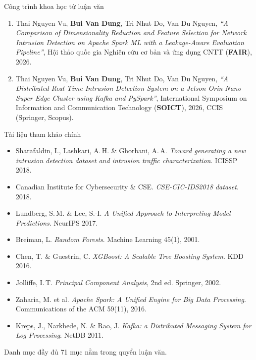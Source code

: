 \documentclass[aspectratio=169, 11pt]{beamer}
\begin{document}
\begin{frame}{Công trình khoa học từ luận văn}
  \begin{enumerate}
    \item Thai Nguyen Vu, \textbf{Bui Van Dung}, Tri Nhut Do, Van Du Nguyen,
      \emph{``A Comparison of Dimensionality Reduction and Feature Selection for
      Network Intrusion Detection on Apache Spark ML with a Leakage-Aware
      Evaluation Pipeline''}, Hội thảo quốc gia Nghiên cứu cơ bản và ứng dụng
      CNTT (\textbf{FAIR}), 2026. 
    \item Thai Nguyen Vu, \textbf{Bui Van Dung}, Tri Nhut Do, Van Du Nguyen,
      \emph{``A Distributed Real-Time Intrusion Detection System on a Jetson
      Orin Nano Super Edge Cluster using Kafka and PySpark''}, International
      Symposium on Information and Communication Technology (\textbf{SOICT}),
      2026, CCIS (Springer, Scopus). 
  \end{enumerate}
\end{frame}

\begin{frame}[label=bk-refs]{Tài liệu tham khảo chính}
  \begin{itemize}\footnotesize
    \setlength{\itemsep}{0.35em}
    \item[{[1]}] Sharafaldin, I., Lashkari, A.\,H. \& Ghorbani, A.\,A.
          \emph{Toward generating a new intrusion detection dataset and
          intrusion traffic characterization}. ICISSP 2018.
          \hfill{}
    \item[{[2]}] Canadian Institute for Cybersecurity \& CSE.
          \emph{CSE-CIC-IDS2018 dataset}. 2018.
          \hfill{}
    \item[{[3]}] Lundberg, S.\,M. \& Lee, S.-I. \emph{A Unified Approach to
          Interpreting Model Predictions}. NeurIPS 2017.
          \hfill{}
    \item[{[4]}] Breiman, L. \emph{Random Forests}. Machine Learning 45(1), 2001.
          \hfill{}
    \item[{[5]}] Chen, T. \& Guestrin, C. \emph{XGBoost: A Scalable Tree Boosting
          System}. KDD 2016.
          \hfill{}
    \item[{[6]}] Jolliffe, I.\,T. \emph{Principal Component Analysis}, 2nd ed.
          Springer, 2002.
          \hfill{}
    \item[{[7]}] Zaharia, M. et al. \emph{Apache Spark: A Unified Engine for Big Data
          Processing}. Communications of the ACM 59(11), 2016.
          \hfill{}
    \item[{[8]}] Kreps, J., Narkhede, N. \& Rao, J. \emph{Kafka: a Distributed
          Messaging System for Log Processing}. NetDB 2011.
          \hfill{}
  \end{itemize}
  \vspace{0.3em}
  \footnotesize Danh mục đầy đủ 71 mục nằm trong quyển luận văn.
\end{frame}
\end{document}
